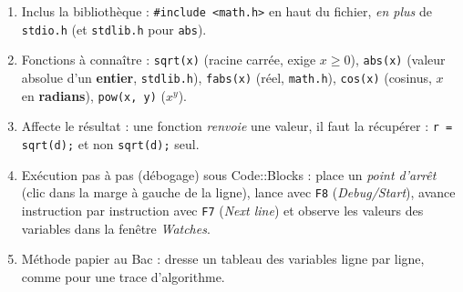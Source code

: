 \documentclass[11pt]{article}
\newcommand{\cle}[1]{{\popxbold\color{popdark}#1}}
\begin{document}
\begin{methode}
\begin{enumerate}
\item \cle{Inclus} la bibliothèque : \texttt{\#include <math.h>} en haut du fichier, \emph{en plus} de \texttt{stdio.h} (et \texttt{stdlib.h} pour \texttt{abs}).
\item \cle{Fonctions à connaître} : \texttt{sqrt(x)} (racine carrée, exige $x \geq 0$), \texttt{abs(x)} (valeur absolue d'un \textbf{entier}, \texttt{stdlib.h}), \texttt{fabs(x)} (réel, \texttt{math.h}), \texttt{cos(x)} (cosinus, $x$ en \textbf{radians}), \texttt{pow(x, y)} ($x^y$).
\item \cle{Affecte} le résultat : une fonction \emph{renvoie} une valeur, il faut la récupérer : \texttt{r = sqrt(d);} et non \texttt{sqrt(d);} seul.
\item \cle{Exécution pas à pas} (débogage) sous Code::Blocks : place un \emph{point d'arrêt} (clic dans la marge à gauche de la ligne), lance avec \texttt{F8} (\emph{Debug/Start}), avance instruction par instruction avec \texttt{F7} (\emph{Next line}) et observe les valeurs des variables dans la fenêtre \emph{Watches}.
\item \cle{Méthode papier} au Bac : dresse un tableau des variables ligne par ligne, comme pour une trace d'algorithme.
\end{enumerate}
\end{methode}
\end{document}

